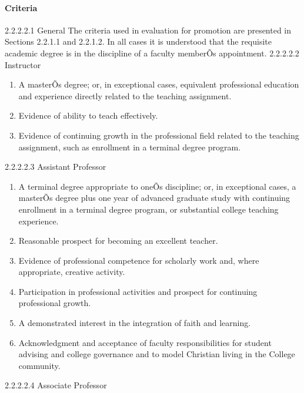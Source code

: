 \documentclass[letterpaper, 11pt]{article}
\begin{document}
			\paragraph{Criteria}
				2.2.2.2.1 General
				The criteria used in evaluation for promotion are presented in Sections 2.2.1.1 and 2.2.1.2. In all cases it is understood that the requisite academic degree is in the discipline of a faculty memberÕs appointment.
				2.2.2.2.2 Instructor
				\begin{enumerate}[label=\alph*)]
					\item{A masterÕs degree; or, in exceptional cases, equivalent professional education and experience directly related to the teaching assignment.}
					\item{Evidence of ability to teach effectively.}
					\item{Evidence of continuing growth in the professional field related to the teaching assignment, such as enrollment in a terminal degree program.}
				\end{enumerate}
				2.2.2.2.3 Assistant Professor
				\begin{enumerate}[label=\alph*)]
					\item{A terminal degree appropriate to oneÕs discipline; or, in exceptional cases, a masterÕs degree plus one year of advanced graduate study with continuing enrollment in a terminal degree program, or substantial college teaching experience.}
					\item{Reasonable prospect for becoming an excellent teacher.}
					\item{Evidence of professional competence for scholarly work and, where appropriate, creative activity.}
					\item{Participation in professional activities and prospect for continuing professional growth.}
					\item{A demonstrated interest in the integration of faith and learning.}
					\item{Acknowledgment and acceptance of faculty responsibilities for student advising and college governance and to model Christian living in the College community.}
				\end{enumerate}
				2.2.2.2.4 Associate Professor
\end{document}
